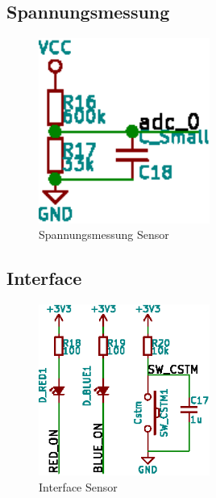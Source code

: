 
\subsection{Spannungsmessung}
\label{subsec:hw:sensor:voltageSense}

\begin{figure}[h!t]
    \centering
    \includegraphics[width=0.5\textwidth]{images/sensor-sch/sensor--sch--sensor.eps}
    \caption[Sensor: Schema Spannungsmessung]{Spannungsmessung Sensor}
\end{figure}


\subsection{Interface}
\label{subsec:hw:sensor:interface}

\begin{figure}[h!t]
    \centering
    \includegraphics[width=0.5\textwidth]{images/sensor-sch/sensor--sch--interface.eps}
    \caption[Sensor: Schema Interface]{Interface Sensor}
\end{figure}

